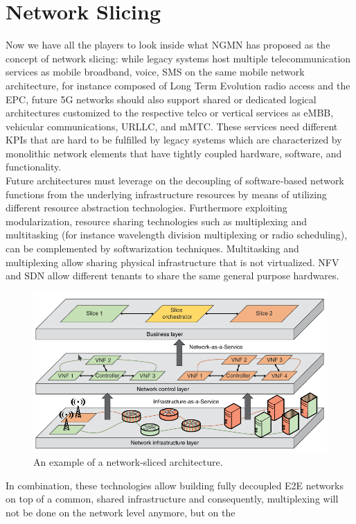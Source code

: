 \documentclass[a4paper,12pt]{report} %
\begin{document}
\newpage
\section{Network Slicing} 
Now we have all the players to look inside what NGMN has proposed as the concept of network slicing: while legacy systems host multiple telecommunication
services as mobile broadband, voice, SMS on the same mobile network architecture, for
instance composed of Long Term Evolution radio access and the \gls{EPC},
future 5G networks should also support shared or dedicated logical architectures customized to the
respective telco or vertical services as \gls{eMBB}, vehicular communications, \gls{URLLC}, and \gls{mMTC}. These services need different KPIs that are
hard to be fulfilled by legacy systems which are characterized by monolithic network elements that
have tightly coupled hardware, software, and functionality. \\
Future architectures must leverage on the decoupling of software‐based network functions from the underlying infrastructure resources by
means of utilizing different resource abstraction technologies.
Furthermore exploiting modularization, resource sharing technologies such as multiplexing and multitasking (for instance
wavelength division multiplexing or radio scheduling), can be complemented
by softwarization techniques. Multitasking and multiplexing allow sharing
physical infrastructure that is not virtualized. NFV and SDN allow different tenants to share the
same general purpose hardwares. 
\begin{figure}[H]
\centering
\includegraphics[scale=0.55]{pics/slice.png}
\caption{An example of a network‐sliced architecture. \cite{al20185g}} 
\label{slice}
\end{figure}
In combination, these technologies allow building fully decoupled E2E networks on top of a common, shared infrastructure and consequently, multiplexing will not be done on the network level anymore, but on the
\end{document}
